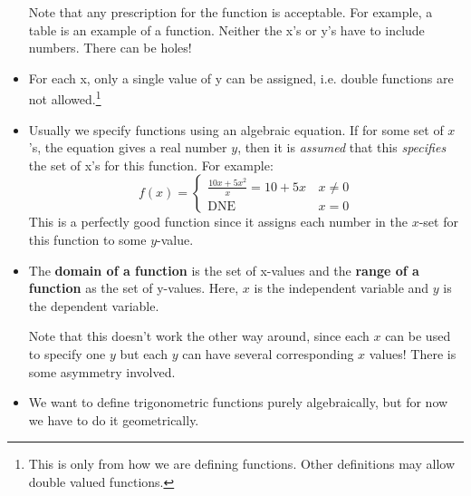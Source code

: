 \begin{itemize}
    Note that any prescription for the function is acceptable. For example, a table is an example of a function. Neither the x's or y's have to include numbers. There can be holes!
    \item For each x, only a single value of y can be assigned, i.e. double functions are not allowed.\footnote{This is only from how we are defining functions. Other definitions may allow double valued functions.}
    \item Usually we specify functions using an algebraic equation. If for some set of $x$'s, the equation gives a real number $y$, then it is \textit{assumed} that this \textit{specifies} the set of x's for this function. For example:
    \begin{equation}
        f(x)=\begin{cases}
            \frac{10x+5x^2}{x}=10+5x\, & x\neq 0\\ 
            \text{DNE}\, & x = 0
        \end{cases}
        \label{eq:}
    \end{equation}
    This is a perfectly good function since it assigns each number in the $x$-set for this function to some $y$-value.
    \item The \textbf{domain of a function} is the set of x-values and the \textbf{range of a function} as the set of y-values. Here, $x$ is the independent variable and $y$ is the dependent variable.
    
    Note that this doesn't work the other way around, since each $x$ can be used to specify one $y$ but each $y$ can have several corresponding $x$ values! There is some asymmetry involved.
    \item We want to define trigonometric functions purely algebraically, but for now we have to do it geometrically.
    \begin{center}
\end{center}
\end{itemize}
